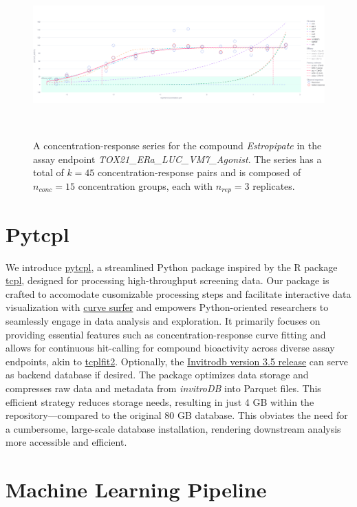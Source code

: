 \begin{figure}[htbp]  %
    \centering
    \includegraphics[width=1.0\textwidth]{figures/concentration_response_series_2.png}  
    \caption{A concentration-response series for the compound \textit{Estropipate} in the assay endpoint \textit{TOX21\_ERa\_LUC\_VM7\_Agonist}. The series has a total of $k = 45$ concentration-response pairs and is composed of $n_{conc} = 15$ concentration groups, each with $n_{rep} = 3$ replicates.}
~\label{fig:concentration_response_series} 
\end{figure}

\section{Pytcpl}
We introduce \href{https://github.com/rbBosshard/pytcpl}{pytcpl}, a streamlined Python package inspired by the R package \href{https://github.com/USEPA/CompTox-ToxCast-tcpl}{tcpl}, designed for processing high-throughput screening data. Our package is crafted to accomodate cusomizable processing steps and facilitate interactive data visualization with \href{https://pytcpl.streamlit.app/}{curve surfer} and empowers Python-oriented researchers to seamlessly engage in data analysis and exploration. It primarily focuses on providing essential features such as concentration-response curve fitting and allows for continuous hit-calling for compound bioactivity across diverse assay endpoints, akin to \href{https://github.com/USEPA/CompTox-ToxCast-tcplFit2}{tcplfit2}. Optionally, the \href{https://cfpub.epa.gov/si/si_public_record_Report.cfm?dirEntryId=355484&Lab=CCTE}{Invitrodb version 3.5 release} can serve as backend database if desired. The package optimizes data storage and compresses raw data and metadata from \emph{invitroDB} into Parquet files. This efficient strategy reduces storage needs, resulting in just 4 GB within the repository—compared to the original 80 GB database. This obviates the need for a cumbersome, large-scale database installation, rendering downstream analysis more accessible and efficient.

\section{Machine Learning Pipeline}
